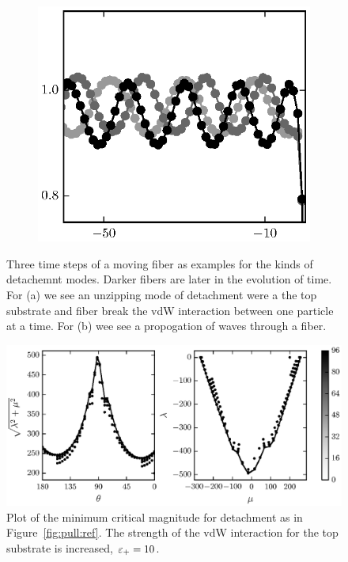 \begin{figure}[t]
\begin{subfigure}{.5\textwidth}
         \includegraphics{./fig/ch3/pull/wave_anim.eps}
         \caption{\label{subfig:travel_waves}}
      \end{subfigure}
      \caption{Three time steps of a moving fiber as examples for the kinds of detachemnt modes. Darker fibers are later in the evolution of time. For (a) we see an unzipping mode of detachment were a the top substrate and fiber break the vdW interaction between one particle at a time. For (b) wee see a propogation of waves through a fiber.\label{fig:animation}}  
   \end{figure}

   \begin{figure}[t]
      \begin{center}
         \includegraphics{./fig/ch3/pull/et10/grid.eps}
      \end{center}      
      \caption{Plot of the minimum critical magnitude for detachment as in Figure~\ref{fig:pull:ref}. The strength of the vdW interaction for the top substrate is increased, $\varepsilon_+=10$.
      \label{fig:pull:et10}}
   \end{figure}

